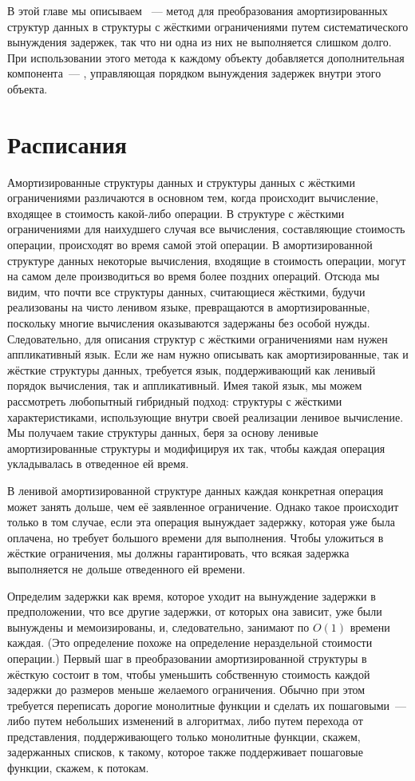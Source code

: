 В этой главе мы описываем ~--- метод для
преобразования амортизированных структур данных в структуры с жёсткими
ограничениями путем систематического вынуждения задержек, так что ни
одна из них не выполняется слишком долго. При использовании этого
метода к каждому объекту добавляется дополнительная компонента~---
, управляющая порядком вынуждения задержек
внутри этого объекта.

\section{Расписания}
\label{sc:7.1}

Амортизированные структуры данных и структуры данных с жёсткими
ограничениями различаются в основном тем, когда происходит вычисление,
входящее в стоимость какой-либо операции. В структуре с жёсткими ограничениями для
наихудшего случая все вычисления, составляющие стоимость операции,
происходят во время самой этой операции. В амортизированной структуре
данных некоторые вычисления, входящие в стоимость операции, могут на
самом деле производиться во время более поздних операций. Отсюда мы
видим, что почти все структуры данных, считающиеся жёсткими, будучи
реализованы на чисто ленивом языке, превращаются в амортизированные,
поскольку многие вычисления оказываются задержаны без особой нужды.
Следовательно, для описания структур с жёсткими ограничениями нам
нужен аппликативный язык. Если же нам нужно описывать как
амортизированные, так и жёсткие структуры данных, требуется язык,
поддерживающий как ленивый порядок вычисления, так и
аппликативный. Имея такой язык, мы можем рассмотреть любопытный
гибридный подход: структуры с жёсткими характеристиками, использующие
внутри своей реализации ленивое вычисление. Мы получаем такие
структуры данных, беря за основу ленивые амортизированные структуры и
модифицируя их так, чтобы каждая операция укладывалась в отведенное ей
время.

В ленивой амортизированной структуре данных каждая конкретная операция
может занять дольше, чем её заявленное ограничение. Однако такое
происходит только в том случае, если эта операция вынуждает задержку,
которая уже была оплачена, но требует большого времени для
выполнения. Чтобы уложиться в жёсткие ограничения, мы должны
гарантировать, что всякая задержка выполняется не дольше отведенного
ей времени.

Определим  задержки как
время, которое уходит на вынуждение задержки в предположении, что все
другие задержки, от которых она зависит, уже были вынуждены и
мемоизированы, и, следовательно, занимают по $O(1)$ времени
каждая. (Это определение похоже на определение нераздельной стоимости
операции.) Первый шаг в преобразовании амортизированной структуры в
жёсткую состоит в том, чтобы уменьшить собственную стоимость каждой
задержки до размеров меньше желаемого ограничения. Обычно при этом
требуется переписать дорогие монолитные функции и сделать их
пошаговыми~--- либо путем небольших изменений в алгоритмах, либо путем
перехода от представления, поддерживающего только монолитные функции,
скажем, задержанных списков, к такому, которое также поддерживает
пошаговые функции, скажем, к потокам.

